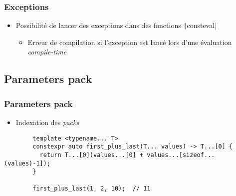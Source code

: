 \documentclass[C++.tex]{subfiles}
\begin{document}
\begin{frame}[fragile]
	\frametitle{Exceptions}
	\begin{itemize}
		\item Possibilité de lancer des exceptions dans des fonctions \texttt|consteval|
		\begin{itemize}
			\item Erreur de compilation si l'exception est lancé lors d'une évaluation \textit{compile-time}
		\end{itemize}
	\end{itemize}

\end{frame}

\subsection*{Parameters pack}
\begin{frame}[fragile]
	\frametitle{Parameters pack}
	\begin{itemize}
		\item Indexation des \textit{packs}
	\end{itemize}

	\begin{verbatim}
		template <typename... T>
		constexpr auto first_plus_last(T... values) -> T...[0] {
		  return T...[0](values...[0] + values...[sizeof...(values)-1]);
		}

		first_plus_last(1, 2, 10);  // 11
	\end{verbatim}


\end{frame}
\end{document}
